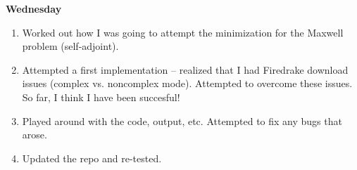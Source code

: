 \documentclass[12pt,a4paper]{article}
\begin{document}
\textbf{Wednesday}

\begin{enumerate}
    \item Worked out how I was going to attempt the minimization for the Maxwell problem (self-adjoint).
    \item Attempted a first implementation -- realized that I had Firedrake download issues (complex vs. noncomplex mode). Attempted to overcome these issues. So far, I think I have been succesful!
    \item Played around with the code, output, etc. Attempted to fix any bugs that arose. 
    \item Updated the repo and re-tested. 
\end{enumerate}
\end{document}
